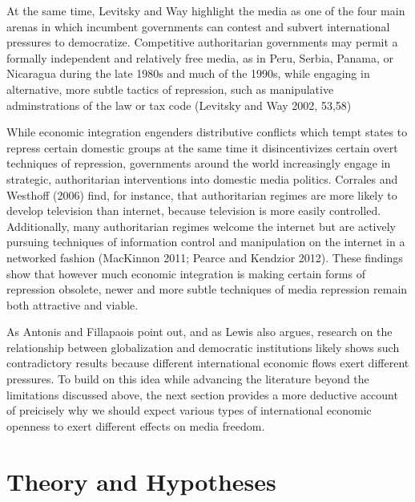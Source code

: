 \documentclass[a4paper]{article}\usepackage[]{graphicx}\usepackage[]{color}
\begin{document}
At the same time, Levitsky and Way highlight the media as one of the four main arenas in which incumbent governments can contest and subvert international pressures to democratize. Competitive authoritarian governments may permit a formally independent and relatively free media, as in Peru, Serbia, Panama, or Nicaragua during the late 1980s and much of the 1990s, while engaging in alternative, more subtle tactics of repression, such as manipulative adminstrations of the law or tax code (Levitsky and Way 2002, 53,58)

While economic integration engenders distributive conflicts which tempt states to repress certain domestic groups at the same time it disincentivizes certain overt techniques of repression, governments around the world increasingly engage in strategic, authoritarian interventions into domestic media politics. Corrales and Westhoff (2006) find, for instance, that authoritarian regimes are more likely to develop television than internet, because television is more easily controlled. Additionally, many authoritarian regimes welcome the internet but are actively pursuing techniques of information control and manipulation on the internet in a networked fashion (MacKinnon 2011; Pearce and Kendzior 2012). These findings show that however much economic integration is making certain forms of repression obsolete, newer and more subtle techniques of media repression remain both attractive and viable.

As Antonis and Fillapaois point out, and as Lewis also argues, research on the relationship between globalization and democratic institutions likely shows such contradictory results because different international economic flows exert different pressures. To build on this idea while advancing the literature beyond the limitations discussed above, the next section provides a more deductive account of preicisely why we should expect various types of international economic openness to exert different effects on media freedom.

\section{Theory and Hypotheses}
\end{document}
